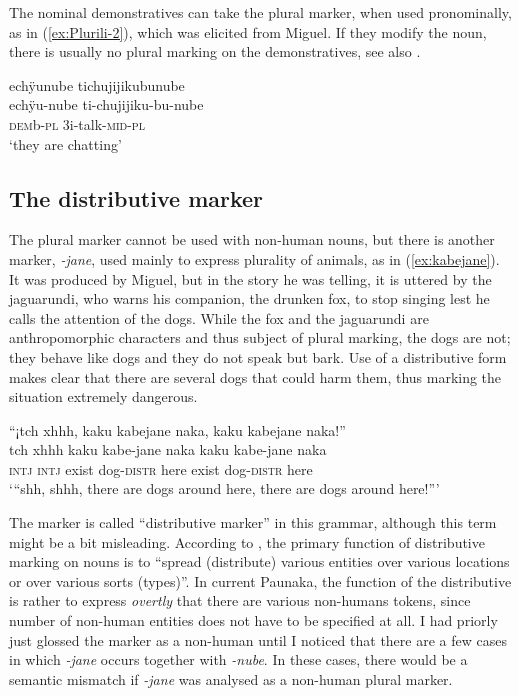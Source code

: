 The nominal demonstratives can take the plural marker, when used pronominally, as in (\ref{ex:Plurili-2}), which was elicited from Miguel. If they modify the noun, there is usually no plural marking on the demonstratives, see also .

\ea\label{ex:Plurili-2}
\begingl
\glpreamble echÿunube tichujijikubunube\\
\gla echÿu-nube ti-chujijiku-bu-nube\\
\glb \textsc{dem}b-\textsc{pl} 3i-talk-\textsc{mid}-\textsc{pl}\\
\glft ‘they are chatting’
\endgl
\trailingcitation{[mrx-e150219s.011]}
\xe
{}

\subsection{The distributive marker}\label{sec:NounPL-jane}

The plural marker cannot be used with non-human nouns, but there is another marker, \textit{-jane}, used mainly to express plurality of animals, as in (\ref{ex:kabejane}). It was produced by Miguel, but in the story he was telling, it is uttered by the jaguarundi, who warns his companion, the drunken fox, to stop singing lest he calls the attention of the dogs. While the fox and the jaguarundi are anthropomorphic characters and thus subject of plural marking, the dogs are not; they behave like dogs and they do not speak but bark. Use of a distributive form makes clear that there are several dogs that could harm them, thus marking the situation extremely dangerous.

\ea\label{ex:kabejane}
\begingl 
\glpreamble “¡tch xhhh, kaku kabejane naka, kaku kabejane naka!”\\
\gla tch xhhh kaku kabe-jane naka kaku kabe-jane naka\\ 
\glb \textsc{intj} \textsc{intj} exist dog-\textsc{distr} here exist dog-\textsc{distr} here\\ 
\glft ‘“shh, shhh, there are dogs around here, there are dogs around here!”’
\trailingcitation{[jmx-n120429ls-x5.381]}
\xe

The marker is called “distributive marker” in this grammar, although this term might be a bit misleading. According to \citet[112]{Corbett2000}, the primary function of distributive marking on nouns is to “spread (distribute) various entities over various locations or over various sorts (types)”. In current Paunaka, the function of the distributive is rather to express \textit{overtly} that there are various non-humans tokens, since number of non-human entities does not have to be specified at all. I had priorly just glossed the marker as a non-human  until I noticed that there are a few cases in which \textit{-jane} occurs together with \textit{-nube}. In these cases, there would be a semantic mismatch if \textit{-jane} was analysed as a non-human plural marker.

